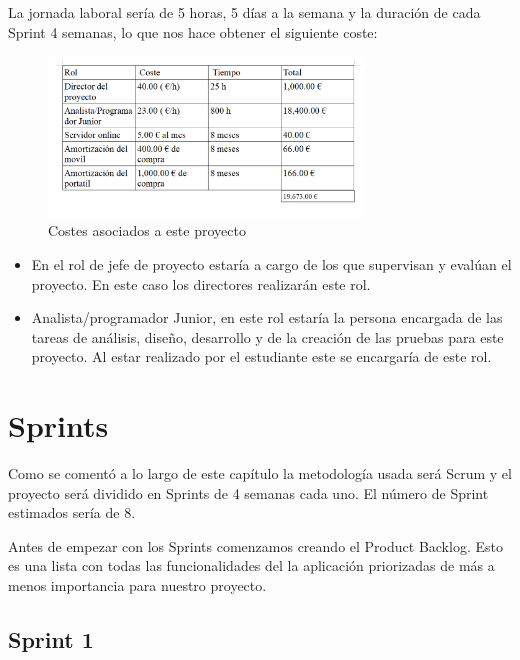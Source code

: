  La jornada laboral sería de 5 horas, 5 días a la semana y la duración de cada Sprint 4 semanas, lo que nos hace obtener el siguiente coste:


\begin{figure}[H]
		\centering
		\includegraphics[width=0.75\textwidth] {coste.png}
		\caption{Costes asociados a este proyecto }
		\label{fig:coste}
	\end{figure}






\begin{itemize}
\item En el rol de jefe de proyecto estaría a cargo de los que 
supervisan y evalúan el proyecto. En este caso los directores realizarán este rol.

\item Analista/programador Junior, en este rol estaría la persona encargada de las tareas de análisis, diseño, desarrollo y de la creación de las pruebas para este proyecto. Al estar realizado por el estudiante este se encargaría de este rol.





\end{itemize}
\section{Sprints}

Como se comentó a lo largo de este capítulo la metodología usada será  Scrum y el proyecto será dividido en Sprints de 4 semanas cada uno. El número de Sprint  estimados sería de 8.




 Antes de empezar con los Sprints comenzamos creando el Product Backlog. Esto es una lista con todas las funcionalidades del la aplicación priorizadas de más a menos importancia para nuestro proyecto. 

\subsection{Sprint 1}

